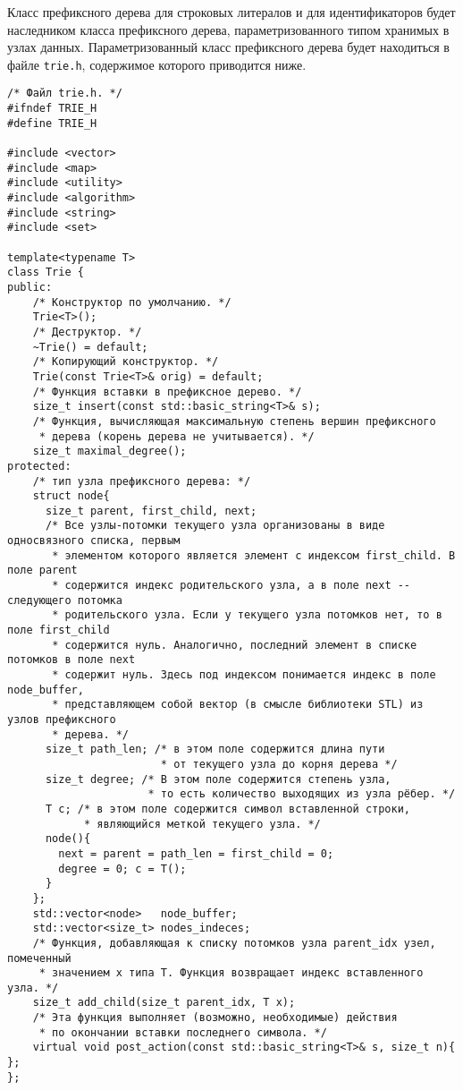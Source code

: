 \documentclass[10pt]{report}
\newcounter{defin}[section]
\newcounter{algor}[section]
\begin{document}
Класс префиксного дерева для строковых литералов и для идентификаторов будет наследником класса префиксного дерева, параметризованного типом хранимых в узлах данных. Параметризованный класс префиксного дерева будет находиться в файле \texttt{trie.h}, содержимое которого приводится ниже.
\begin{verbatim}
/* Файл trie.h. */
#ifndef TRIE_H
#define TRIE_H

#include <vector>
#include <map>
#include <utility>
#include <algorithm>
#include <string>
#include <set>

template<typename T>
class Trie {
public:
    /* Конструктор по умолчанию. */
    Trie<T>();
    /* Деструктор. */
    ~Trie() = default;
    /* Копирующий конструктор. */
    Trie(const Trie<T>& orig) = default;
    /* Функция вставки в префиксное дерево. */
    size_t insert(const std::basic_string<T>& s);
    /* Функция, вычисляющая максимальную степень вершин префиксного
     * дерева (корень дерева не учитывается). */
    size_t maximal_degree();
protected:
    /* тип узла префиксного дерева: */
    struct node{
      size_t parent, first_child, next;
      /* Все узлы-потомки текущего узла организованы в виде односвязного списка, первым
       * элементом которого является элемент с индексом first_child. В поле parent
       * содержится индекс родительского узла, а в поле next -- следующего потомка
       * родительского узла. Если у текущего узла потомков нет, то в поле first_child
       * содержится нуль. Аналогично, последний элемент в списке потомков в поле next
       * содержит нуль. Здесь под индексом понимается индекс в поле node_buffer,
       * представляющем собой вектор (в смысле библиотеки STL) из узлов префиксного
       * дерева. */
      size_t path_len; /* в этом поле содержится длина пути
                        * от текущего узла до корня дерева */
      size_t degree; /* В этом поле содержится степень узла,
                      * то есть количество выходящих из узла рёбер. */
      T c; /* в этом поле содержится символ вставленной строки,
            * являющийся меткой текущего узла. */
      node(){
        next = parent = path_len = first_child = 0;
        degree = 0; c = T();
      }
    };
    std::vector<node>   node_buffer;
    std::vector<size_t> nodes_indeces;
    /* Функция, добавляющая к списку потомков узла parent_idx узел, помеченный
     * значением x типа T. Функция возвращает индекс вставленного узла. */
    size_t add_child(size_t parent_idx, T x);
    /* Эта функция выполняет (возможно, необходимые) действия
     * по окончании вставки последнего символа. */
    virtual void post_action(const std::basic_string<T>& s, size_t n){ };
};


\end{verbatim}
\end{document}
